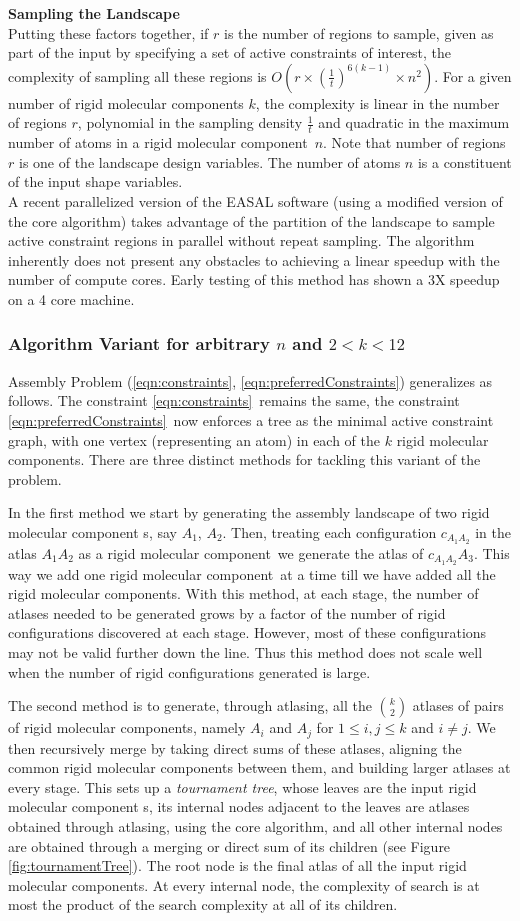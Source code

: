 \documentclass[]{article}
\newcommand{\rmc}{rigid molecular component}
\newcommand{\ctwo}{\ref{eqn:preferredConstraints}}
\newcommand{\cone}{\ref{eqn:constraints}}
\begin{document}
\noindent \textbf{Sampling the Landscape\\}
Putting these factors together, if $r$ is the number of regions to sample,
given as part of the input by specifying a set of active constraints of
interest, the complexity of sampling all these regions is $O(r \times
(\frac{1}{t})^{6(k-1)} \times n^2)$. For a given number of \rmc s $k$, the
complexity is linear in the number of regions $r$, polynomial in the sampling
density $\frac{1}{t}$ and quadratic in the maximum number of atoms in a \rmc\
$n$.  Note that number of regions $r$ is one of the landscape design variables.
The number of atoms $n$ is a constituent of the input shape variables.\\

A recent parallelized version of the EASAL software (using a modified version
of the core algorithm) takes advantage of the partition of the landscape to
sample active constraint regions in parallel without repeat sampling. The
algorithm inherently does not present any obstacles to achieving a linear
speedup with the number of compute cores. Early testing of this method has
shown a 3X speedup on a 4 core machine.

\subsubsection{Algorithm Variant for arbitrary $n$ and $2<k<12$}
\label{sec:AlgorithmVariantkg2}
Assembly Problem (\cone, \ctwo) generalizes as follows. The constraint \cone\
remains the same, the constraint \ctwo\ now enforces a tree as the minimal
active constraint graph, with one vertex (representing an atom) in each of the
$k$ \rmc s. There are three distinct methods for tackling this variant of the
problem. 

In the first method we start by generating the assembly landscape of two \rmc
s, say $A_1$, $A_2$. Then, treating each configuration $c_{A_1A_2}$ in the
atlas $A_1A_2$ as a \rmc\ we generate the atlas of $c_{A_1A_2}A_3$. This way
we add one \rmc\ at a time till we have added all the \rmc s. With this method,
at each stage, the number of atlases needed to be generated grows by a factor
of the number of rigid configurations discovered at each stage. However,
most of these configurations may not be valid further down the line.
Thus this method does not scale well when the number of rigid configurations
generated is large.

The second method is to generate, through atlasing, all the $\binom{k}{2}$
atlases of pairs of \rmc s, namely $A_i$ and $A_j$ for $1 \le i, j \le k$ and
$i\ne j$. We then recursively merge by taking direct sums of these atlases,
aligning the common \rmc s between them, and building larger atlases at every
stage. This sets up a \emph{tournament tree}, whose leaves are the input \rmc
s, its internal nodes adjacent to the leaves are atlases obtained through
atlasing, using the core algorithm, and all other internal nodes are obtained
through a merging or direct sum of its children (see Figure
\ref{fig:tournamentTree}).  The root node is the final atlas of all the input
\rmc s. At every internal node, the complexity of search is at most the product
of the search complexity at all of its children.
\end{document}
